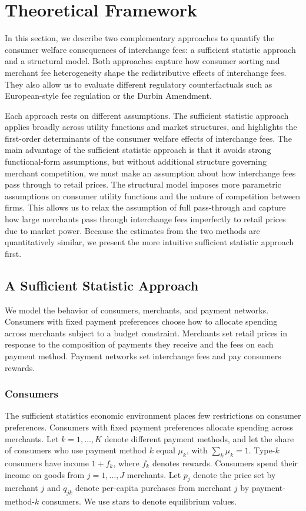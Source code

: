 \documentclass[main.tex]{subfiles}
\begin{document}
\section{Theoretical Framework}
\label{sec:redistribution}

In this section, we describe two complementary approaches to quantify the consumer welfare consequences of interchange fees: a sufficient statistic approach and a structural model.
Both approaches capture how consumer sorting and merchant fee heterogeneity shape the redistributive effects of interchange fees.
They also allow us to evaluate different regulatory counterfactuals such as European-style fee regulation or the Durbin Amendment.

Each approach rests on different assumptions. 
The sufficient statistic approach applies broadly across utility functions and market structures, and highlights the first-order determinants of the consumer welfare effects of interchange fees.
The main advantage of the sufficient statistic approach is that it avoids strong functional-form assumptions, but without additional structure governing merchant competition, we must make an assumption about how interchange fees pass through to retail prices. 
The structural model imposes more parametric assumptions on consumer utility functions and the nature of competition between firms. 
This allows us to relax the assumption of full pass-through and capture how large merchants pass through interchange fees imperfectly to retail prices due to market power.
Because the estimates from the two methods are quantitatively similar, we present the more intuitive sufficient statistic approach first.

\subsection{A Sufficient Statistic Approach}

We model the behavior of consumers, merchants, and payment networks.
Consumers with fixed payment preferences choose how to allocate spending across merchants subject to a budget constraint.
Merchants set retail prices in response to the composition of payments they receive and the fees on each payment method.
Payment networks set interchange fees and pay consumers rewards.

\subsubsection{Consumers}
The sufficient statistics economic environment places few restrictions on consumer preferences.
Consumers with fixed payment preferences allocate spending across merchants.
Let $k=1,\ldots,K$ denote different payment methods, and let the share of consumers who use payment method $k$ equal $\mu_k$, with $\sum_k \mu_k=1$.
Type-$k$ consumers have income $1 + f_k$, where $f_k$ denotes rewards.
Consumers spend their income on goods from $j=1,\ldots,J$ merchants.
Let $p_j$ denote the price set by merchant $j$ and $q_{jk}$ denote per-capita purchases from merchant $j$ by payment-method-$k$ consumers.
We use stars to denote equilibrium values.
\end{document}
